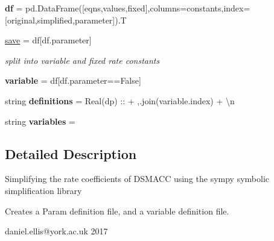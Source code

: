 \begin{DoxyCompactItemize}
\item 
\mbox{\label{namespacesimplify__rates_a8c18a8ba4e3ee8345970ff62482b41ef}} 
{\bfseries df} = pd.\+Data\+Frame(\mbox{[}eqns,values,fixed\mbox{]},columns=constants,index=\mbox{[}\textquotesingle{}original\textquotesingle{},\textquotesingle{}simplified\textquotesingle{},\textquotesingle{}parameter\textquotesingle{}\mbox{]}).T
\item 
\mbox{\label{namespacesimplify__rates_a3cdf5a6cd15c4382f0420647fefded1c}} 
\mbox{\hyperlink{namespacesimplify__rates_a3cdf5a6cd15c4382f0420647fefded1c}{save}} = df\mbox{[}df.\+parameter\mbox{]}
\begin{DoxyCompactList}\small\item\em split into variable and fixed rate constants \end{DoxyCompactList}\item 
\mbox{\label{namespacesimplify__rates_a96869f829cae709ac6fd563faf6d5791}} 
{\bfseries variable} = df\mbox{[}df.\+parameter==False\mbox{]}
\item 
\mbox{\label{namespacesimplify__rates_a1d2c39c6058806173e47118bd65e3f2c}} 
string {\bfseries definitions} = \textquotesingle{}Real(dp) \+:: \textquotesingle{}+ \textquotesingle{},\textquotesingle{}.join(variable.\+index) + \textquotesingle{}\textbackslash{}n\textquotesingle{}
\item 
\mbox{\label{namespacesimplify__rates_a2bbe67188c1665ed96ab5e7bd7cf0ce0}} 
string {\bfseries variables} = \textquotesingle{}\textquotesingle{}
\end{DoxyCompactItemize}


\subsection{Detailed Description}
\begin{DoxyVerb}Simplifying the rate coefficients of DSMACC using the sympy symbolic simplification library

Creates a Param definition file, and a variable definition file. 


daniel.ellis@york.ac.uk 2017
\end{DoxyVerb}
 

